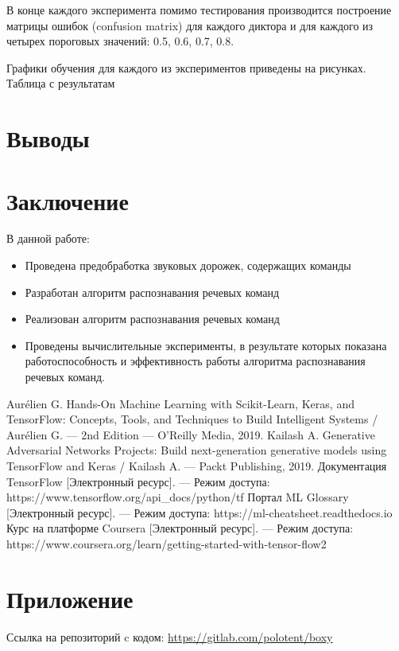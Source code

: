 \documentclass[14pt]{article}
\begin{document}
В конце каждого эксперимента помимо тестирования производится построение матрицы ошибок (confusion matrix) для каждого диктора и для каждого из четырех пороговых значений: 0.5, 0.6, 0.7, 0.8.

Графики обучения для каждого из экспериментов приведены на рисунках.
\\

Таблица с результатам

\section*{Выводы}
\newpage

\section*{Заключение}
В данной работе:
\begin{itemize}[leftmargin=2cm]
\item Проведена предобработка звуковых дорожек, содержащих команды
\item Разработан алгоритм распознавания речевых команд
\item Реализован алгоритм распознавания речевых команд
\item Проведены вычислительные эксперименты, в результате которых	 показана работоспособность и эффективность работы алгоритма распознавания речевых команд.
\end{itemize}
\newpage

\begin{thebibliography}{3}
Aurélien G. Hands-On Machine Learning with Scikit-Learn, Keras, and TensorFlow: Concepts, Tools, and Techniques to Build Intelligent Systems / Aurélien G. --- 2nd Edition --- O'Reilly Media, 2019.
Kailash A. Generative Adversarial Networks Projects: Build next-generation generative models using TensorFlow and Keras / Kailash A. ---  Packt Publishing, 2019.
Документация TensorFlow [Электронный ресурс]. --- Режим доступа: https://www.tensorflow.org/api\_docs/python/tf
Портал ML Glossary [Электронный ресурс]. --- Режим доступа: https://ml-cheatsheet.readthedocs.io
Курс на платформе Coursera [Электронный ресурс]. --- Режим доступа: https://www.coursera.org/learn/getting-started-with-tensor-flow2
\end{thebibliography}
\newpage

\section*{Приложение}
Ссылка на репозиторий c кодом: \url{https://gitlab.com/polotent/boxy}
\restoregeometry
\end{document}
